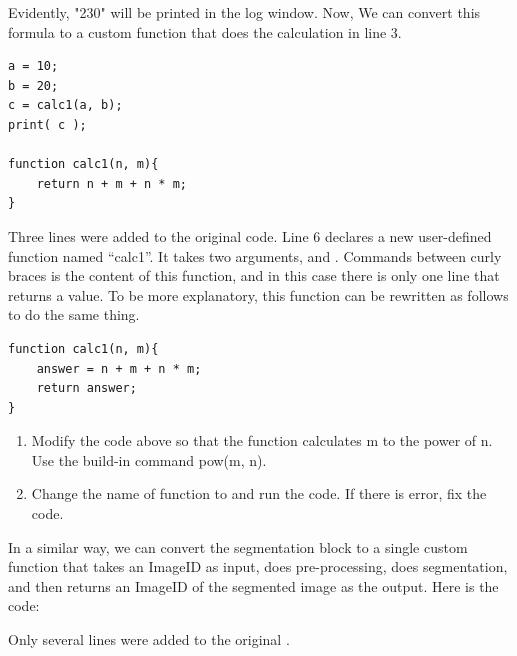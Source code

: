 Evidently, "230" will be printed in the log window. Now, We can convert this formula to a custom function  that does the calculation in line 3.

\begin{lstlisting}[morekeywords={*, function, return}]
a = 10;
b = 20;
c = calc1(a, b);
print( c );

function calc1(n, m){
	return n + m + n * m;
}
\end{lstlisting}

Three lines were added to the original code. Line 6 declares a new user-defined function named ``calc1''. It takes two arguments,  and .  Commands between curly braces is the content of this function, and in this case there is only one line that returns a value. To be more explanatory, this function can be rewritten as follows to do the same thing. 

\begin{lstlisting}[morekeywords={*, function, return}]
function calc1(n, m){
    answer = n + m + n * m;
	return answer;
}
\end{lstlisting}

\begin{indentexercise}{5}
\begin{enumerate}
\item Modify the code above so that the function  calculates m to the power of n. Use the build-in command pow(m, n). 

\item Change the name of function to  and run the code. If there is error, fix the code. 
\end{enumerate}

\end{indentexercise}

In a similar way, we can convert the segmentation block to a single custom function that takes an ImageID as input, does pre-processing, does segmentation, and then returns an ImageID of the segmented image as the output. Here is the code: 



Only several lines were added to the original . 

